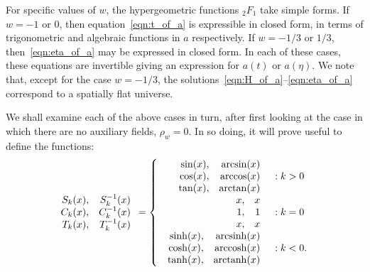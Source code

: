 For specific values of \(w\), the hypergeometric functions \(_2F_1\) take simple forms. If \(w=-1\) or \(0\), then equation~\eqref{eqn:t_of_a} is expressible in closed form, in terms of trigonometric and algebraic functions in \(a\) respectively. If \(w=-1/3\) or \(1/3\), then~\eqref{eqn:eta_of_a} may be expressed in closed form. In each of these cases, these equations are invertible giving an expression for \(a(t)\) or \(a(\eta)\).  We note that, except for the case \(w=-1/3\), the solutions~\eqref{eqn:H_of_a}--\eqref{eqn:eta_of_a} correspond to a spatially flat universe.

We shall examine each of the above cases in turn, after first looking at the case in which there are no auxiliary fields, \(\rho_w=0\).  In so doing, it will prove useful to define the functions:
\begin{equation}
  \begin{array}{rr}
    S_k(x),&S_k^{-1}(x)
    \\ 
    C_k(x),&C_k^{-1}(x)
    \\ 
    T_k(x),&T_k^{-1}(x)
    \\
  \end{array}
  =
  \left\{
  \begin{array}{rl}
    \begin{array}{rr}
      \sin(x),&\arcsin(x)
      \\ 
      \cos(x),&\arccos(x)
      \\ 
      \tan(x),&\arctan(x)
      \\
    \end{array}
    &: k>0 \\
    \begin{array}{rr}
      x,&x
      \\ 
      1,&1
      \\ 
      x,&x
      \\
    \end{array}
    &: k=0 \\
    \begin{array}{rr}
      \sinh(x),&\operatorname{arcsinh}(x)
      \\ 
      \cosh(x),&\operatorname{arccosh}(x)
      \\ 
      \tanh(x),&\operatorname{arctanh}(x)
      \\
    \end{array}
    &: k<0.
  \end{array}
  \right. 
\end{equation}

